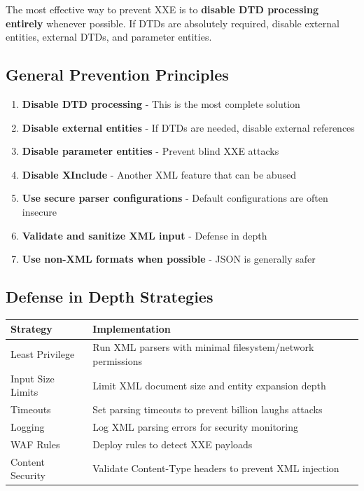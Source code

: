 \documentclass{article}
\begin{document}
\begin{infobox}
The most effective way to prevent XXE is to \textbf{disable DTD processing entirely} whenever possible. If DTDs are absolutely required, disable external entities, external DTDs, and parameter entities.
\end{infobox}

\subsection{General Prevention Principles}

\begin{enumerate}
    \item \textbf{Disable DTD processing} - This is the most complete solution
    \item \textbf{Disable external entities} - If DTDs are needed, disable external references
    \item \textbf{Disable parameter entities} - Prevent blind XXE attacks
    \item \textbf{Disable XInclude} - Another XML feature that can be abused
    \item \textbf{Use secure parser configurations} - Default configurations are often insecure
    \item \textbf{Validate and sanitize XML input} - Defense in depth
    \item \textbf{Use non-XML formats when possible} - JSON is generally safer
\end{enumerate}


\subsection{Defense in Depth Strategies}

\begin{table}[h]
\centering
\begin{tabular}{|p{4cm}|p{9cm}|}
\hline
\textbf{Strategy} & \textbf{Implementation} \\
\hline
Least Privilege & Run XML parsers with minimal filesystem/network permissions \\
\hline
Input Size Limits & Limit XML document size and entity expansion depth \\
\hline
Timeouts & Set parsing timeouts to prevent billion laughs attacks \\
\hline
Logging & Log XML parsing errors for security monitoring \\
\hline
WAF Rules & Deploy rules to detect XXE payloads \\
\hline
Content Security & Validate Content-Type headers to prevent XML injection \\
\hline
\end{tabular}
\end{table}
\end{document}
